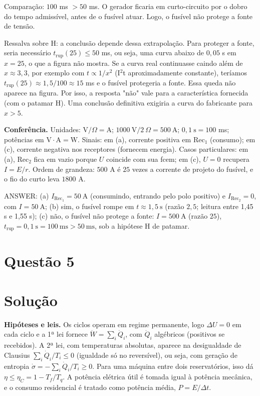 \documentclass{article}%
\begin{document}
Comparação: $100$ ms $> 50$ ms. O gerador ficaria em curto-circuito por o dobro do tempo admissível, antes de o fusível atuar. Logo, o fusível não protege a fonte de tensão.

Ressalva sobre H: a conclusão depende dessa extrapolação. Para proteger a fonte, seria necessário $t_{\text{rup}}(25) \le 50$ ms, ou seja, uma curva abaixo de $0{,}05$ s em $x = 25$, o que a figura não mostra. Se a curva real continuasse caindo além de $x \approx 3{,}3$, por exemplo com $t \propto 1/x^2$ (I$^2$t aproximadamente constante), teríamos $t_{\text{rup}}(25) \approx 1{,}5/100 \approx 15$ ms e o fusível protegeria a fonte. Essa queda não aparece na figura. Por isso, a resposta "não" vale para a característica fornecida (com o patamar H). Uma conclusão definitiva exigiria a curva do fabricante para $x > 5$.

\textbf{Conferência.} Unidades: $\text{V}/\Omega = \text{A}$; $1000\ \text{V}/2\ \Omega = 500\ \text{A}$; $0{,}1\ \text{s} = 100$ ms; potências em $\text{V}\cdot\text{A} = \text{W}$. Sinais: em (a), corrente positiva em Rec$_1$ (consumo); em (c), corrente negativa nos receptores (fornecem energia). Casos particulares: em (a), Rec$_2$ fica em vazio porque $U$ coincide com sua fcem; em (c), $U = 0$ recupera $I = E/r$. Ordem de grandeza: $500$ A é $25$ vezes a corrente de projeto do fusível, e o fio do curto leva $1800$ A.

ANSWER: (a) $I_{\text{Rec}_1} = 50\ \text{A}$ (consumindo, entrando pelo polo positivo) e $I_{\text{Rec}_2} = 0$, com $I = 50\ \text{A}$; (b) sim, o fusível rompe em $t \approx 1{,}5\ \text{s}$ (razão $2{,}5$; leitura entre 1,45 s e 1,55 s); (c) não, o fusível não protege a fonte: $I = 500\ \text{A}$ (razão $25$), $t_{\text{rup}} = 0{,}1\ \text{s} = 100\ \text{ms} > 50\ \text{ms}$, sob a hipótese H de patamar.%
\newpage%
\section*{Questão 5}

\section*{Solução}

\textbf{Hipóteses e leis.} Os ciclos operam em regime permanente, logo $\Delta U=0$ em cada ciclo e a 1ª lei fornece $\dot W=\sum_i\dot Q_i$, com $\dot Q_i$ algébricos (positivos se recebidos). A 2ª lei, com temperaturas absolutas, aparece na desigualdade de Clausius $\sum_i\dot Q_i/T_i\le 0$ (igualdade só no reversível), ou seja, com geração de entropia $\dot\sigma=-\sum_i\dot Q_i/T_i\ge 0$. Para uma máquina entre dois reservatórios, isso dá $\eta\le\eta_C=1-T_f/T_q$. A potência elétrica útil é tomada igual à potência mecânica, e o consumo residencial é tratado como potência média, $P=E/\Delta t$.
\end{document}
